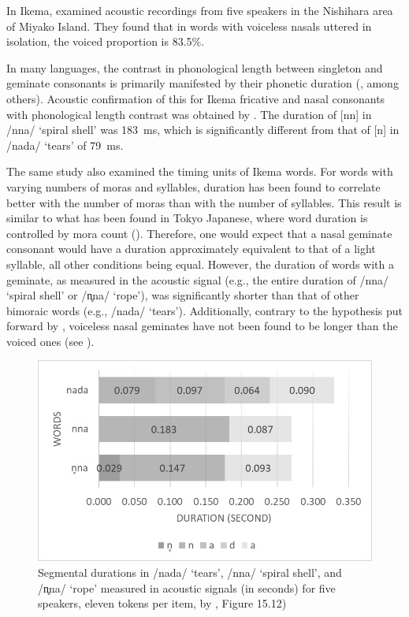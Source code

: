 \documentclass[output=paper]{langscibook}
\begin{document}
In Ikema, \citet{ShinoharaFujimoto2018} examined acoustic recordings from five speakers in the Nishihara area of Miyako Island. They found that in words with voiceless nasals uttered in isolation, the voiced proportion is 83.5\%.

In many languages, the contrast in phonological length between singleton and geminate consonants is primarily manifested by their phonetic duration (\citealt{LahiriHankamer1988}, among others). Acoustic confirmation of this for Ikema fricative and nasal consonants with phonological length contrast was obtained by \citet{ShinoharaFujimoto2018}. The duration of [nn] in /nna/ ‘spiral shell’ was 183~ms, which is significantly different from that of [n] in /nada/ ‘tears’ of 79~ms.

The same study also examined the timing units of Ikema words. For words with varying numbers of moras and syllables, duration has been found to correlate better with the number of moras than with the number of syllables. This result is similar to what has been found in Tokyo Japanese, where word duration is controlled by mora count (\citealt{SagisakaTohkura1984}). Therefore, one would expect that a nasal geminate consonant would have a duration approximately equivalent to that of a light syllable, all other conditions being equal. However, the duration of words with a geminate, as measured in the acoustic signal (e.g., the entire duration of /nna/ ‘spiral shell’ or /n̥na/ ‘rope’), was significantly shorter than that of other bimoraic words (e.g., /nada/ ‘tears’). Additionally, contrary to the hypothesis put forward by \citet{LadefogedMaddieson1996}, voiceless nasal geminates have not been found to be longer than the voiced ones (see ).




\begin{figure}
\includegraphics[width=\textwidth]{figures/a13ShinoharaHussainAmelot-img002.png}
\caption{\label{fig:shinohara:2}Segmental durations in /nada/ ‘tears’, /nna/ ‘spiral shell’, and /n̥na/ ‘rope’ measured in acoustic signals (in seconds) for five speakers, eleven tokens per item, by \citet[264]{ShinoharaFujimoto2018}, Figure 15.12)}
\end{figure}
\end{document}
